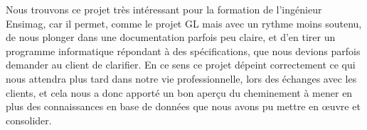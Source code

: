 \documentclass[10pt]{article}
\begin{document}
Nous trouvons ce projet très intéressant pour la formation de l'ingénieur Ensimag, car il permet, comme le projet GL mais avec un
rythme moins soutenu, de nous plonger dans une documentation parfois peu claire, et d'en tirer un programme informatique répondant
à des spécifications, que nous devions parfois demander au client de clarifier. En ce sens ce projet dépeint correctement ce qui nous
attendra plus tard dans notre vie professionnelle, lors des échanges avec les clients, et cela nous a donc apporté un bon aperçu
du cheminement à mener en plus des connaissances en base de données que nous avons pu mettre en \oe{}uvre et consolider.
\end{document}
